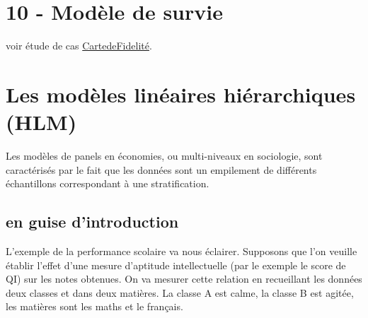 \documentclass[
]{book}
\begin{document}
\hypertarget{moduxe8le-de-survie}{%
\chapter{10 - Modèle de survie}\label{moduxe8le-de-survie}}

voir étude de cas \href{https://github.com/BenaventC/survival}{CartedeFidelité}.

\hypertarget{les-moduxe8les-linuxe9aires-hiuxe9rarchiques-hlm}{%
\chapter{Les modèles linéaires hiérarchiques (HLM)}\label{les-moduxe8les-linuxe9aires-hiuxe9rarchiques-hlm}}

Les modèles de panels en économies, ou multi-niveaux en sociologie, sont caractérisés par le fait que les données sont un empilement de différents échantillons correspondant à une stratification.

\hypertarget{en-guise-dintroduction}{%
\section{en guise d'introduction}\label{en-guise-dintroduction}}

L'exemple de la performance scolaire va nous éclairer. Supposons que l'on veuille établir l'effet d'une mesure d'aptitude intellectuelle (par le exemple le score de QI) sur les notes obtenues. On va mesurer cette relation en recueillant les données deux classes et dans deux matières. La classe A est calme, la classe B est agitée, les matières sont les maths et le français.
\end{document}
